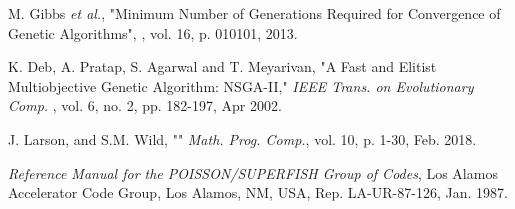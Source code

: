 \documentclass[letterpaper,  %
              ]{jacow-2_3}   %
\begin{document}
\begin{thebibliography}{99}
M. Gibbs \emph{et al.},
"Minimum Number of Generations Required 
for Convergence of Genetic Algorithms",
\emph{}, vol. 16,
p. 010101, 2013.

K. Deb, A. Pratap, S. Agarwal and T. Meyarivan, 
"A Fast and Elitist Multiobjective Genetic Algorithm: NSGA-II," 
\emph{IEEE Trans. on Evolutionary Comp.} , 
vol. 6, no. 2, pp. 182-197, Apr 2002.

J. Larson, and S.M. Wild, ""
\emph{Math. Prog. Comp.}, vol. 10, 
p. 1-30, Feb. 2018. 

\emph{Reference Manual for the POISSON/SUPERFISH Group of 
	Codes},  Los Alamos Accelerator Code Group,  
 Los Alamos, NM, USA, 
 Rep. LA-UR-87-126, Jan. 1987.
\end{thebibliography}
\end{document}
